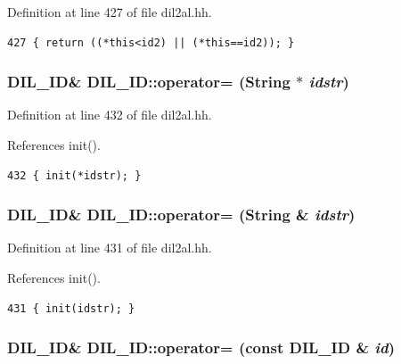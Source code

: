 Definition at line 427 of file dil2al.hh.



\footnotesize\begin{verbatim}427 { return ((*this<id2) || (*this==id2)); }
\end{verbatim}\normalsize 
{}
\subsubsection{\setlength{\rightskip}{0pt plus 5cm}DIL\_\-ID\& DIL\_\-ID::operator= ({\bf String} $\ast$ {\em idstr})\hspace{0.3cm}{\tt  [inline]}}\label{classDIL__ID_a13}




Definition at line 432 of file dil2al.hh.

References init().



\footnotesize\begin{verbatim}432 { init(*idstr); }
\end{verbatim}\normalsize 
{}
\subsubsection{\setlength{\rightskip}{0pt plus 5cm}DIL\_\-ID\& DIL\_\-ID::operator= ({\bf String} \& {\em idstr})\hspace{0.3cm}{\tt  [inline]}}\label{classDIL__ID_a12}




Definition at line 431 of file dil2al.hh.

References init().



\footnotesize\begin{verbatim}431 { init(idstr); }
\end{verbatim}\normalsize 
{}
\subsubsection{\setlength{\rightskip}{0pt plus 5cm}DIL\_\-ID\& DIL\_\-ID::operator= (const DIL\_\-ID \& {\em id})\hspace{0.3cm}{\tt  [inline]}}\label{classDIL__ID_a5}




